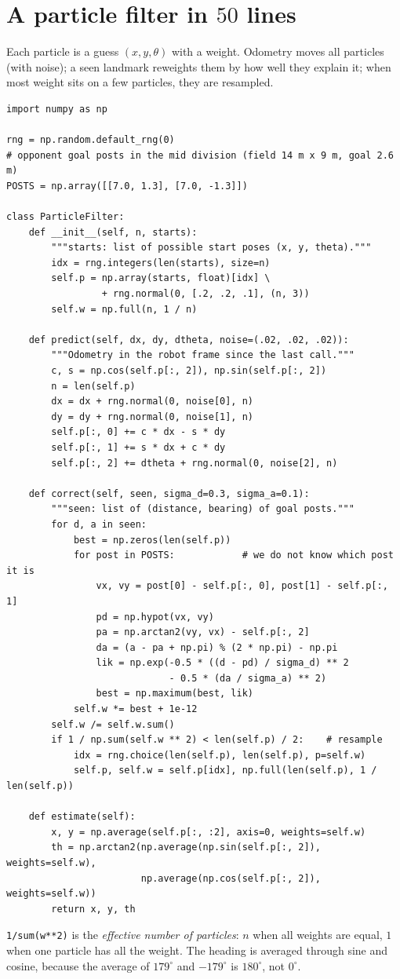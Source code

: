 \section*{A particle filter in $50$ lines}
Each particle is a guess $(x,y,\theta)$ with a weight. Odometry moves all particles (with noise); a seen landmark reweights them by how well they explain it; when most weight sits on a few particles, they are resampled.
\begin{verbatim}
import numpy as np

rng = np.random.default_rng(0)
# opponent goal posts in the mid division (field 14 m x 9 m, goal 2.6 m)
POSTS = np.array([[7.0, 1.3], [7.0, -1.3]])

class ParticleFilter:
    def __init__(self, n, starts):
        """starts: list of possible start poses (x, y, theta)."""
        idx = rng.integers(len(starts), size=n)
        self.p = np.array(starts, float)[idx] \
                 + rng.normal(0, [.2, .2, .1], (n, 3))
        self.w = np.full(n, 1 / n)

    def predict(self, dx, dy, dtheta, noise=(.02, .02, .02)):
        """Odometry in the robot frame since the last call."""
        c, s = np.cos(self.p[:, 2]), np.sin(self.p[:, 2])
        n = len(self.p)
        dx = dx + rng.normal(0, noise[0], n)
        dy = dy + rng.normal(0, noise[1], n)
        self.p[:, 0] += c * dx - s * dy
        self.p[:, 1] += s * dx + c * dy
        self.p[:, 2] += dtheta + rng.normal(0, noise[2], n)

    def correct(self, seen, sigma_d=0.3, sigma_a=0.1):
        """seen: list of (distance, bearing) of goal posts."""
        for d, a in seen:
            best = np.zeros(len(self.p))
            for post in POSTS:            # we do not know which post it is
                vx, vy = post[0] - self.p[:, 0], post[1] - self.p[:, 1]
                pd = np.hypot(vx, vy)
                pa = np.arctan2(vy, vx) - self.p[:, 2]
                da = (a - pa + np.pi) % (2 * np.pi) - np.pi
                lik = np.exp(-0.5 * ((d - pd) / sigma_d) ** 2
                             - 0.5 * (da / sigma_a) ** 2)
                best = np.maximum(best, lik)
            self.w *= best + 1e-12
        self.w /= self.w.sum()
        if 1 / np.sum(self.w ** 2) < len(self.p) / 2:    # resample
            idx = rng.choice(len(self.p), len(self.p), p=self.w)
            self.p, self.w = self.p[idx], np.full(len(self.p), 1 / len(self.p))

    def estimate(self):
        x, y = np.average(self.p[:, :2], axis=0, weights=self.w)
        th = np.arctan2(np.average(np.sin(self.p[:, 2]), weights=self.w),
                        np.average(np.cos(self.p[:, 2]), weights=self.w))
        return x, y, th
\end{verbatim}
\texttt{1/sum(w**2)} is the \emph{effective number of particles}: $n$ when all weights are equal, $1$ when one particle has all the weight. The heading is averaged through sine and cosine, because the average of $179^\circ$ and $-179^\circ$ is $180^\circ$, not $0^\circ$.

